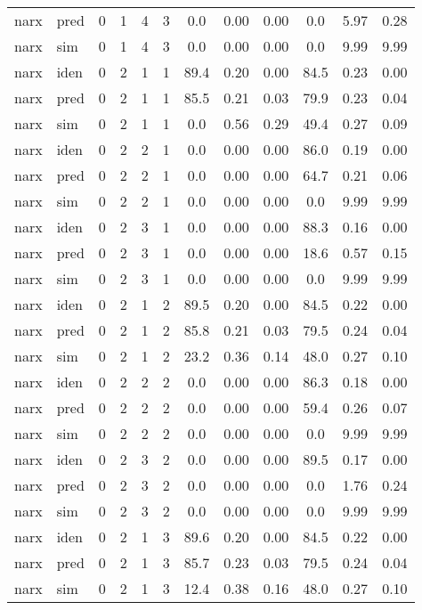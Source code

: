 \begin{landscape}
\begin{center}
\begin{longtable}{ll|cccc|ccc|ccc}
narx & pred & 0 & 1 & 4 & 3 & 0.0 & 0.00 & 0.00 & 0.0 & 5.97 & 0.28 \\ 
narx & sim & 0 & 1 & 4 & 3 & 0.0 & 0.00 & 0.00 & 0.0 & 9.99 & 9.99 \\ 
 \hline 
narx & iden & 0 & 2 & 1 & 1 & 89.4 & 0.20 & 0.00 & 84.5 & 0.23 & 0.00 \\ 
narx & pred & 0 & 2 & 1 & 1 & 85.5 & 0.21 & 0.03 & 79.9 & 0.23 & 0.04 \\ 
narx & sim & 0 & 2 & 1 & 1 & 0.0 & 0.56 & 0.29 & 49.4 & 0.27 & 0.09 \\ 
 \hline 
narx & iden & 0 & 2 & 2 & 1 & 0.0 & 0.00 & 0.00 & 86.0 & 0.19 & 0.00 \\ 
narx & pred & 0 & 2 & 2 & 1 & 0.0 & 0.00 & 0.00 & 64.7 & 0.21 & 0.06 \\ 
narx & sim & 0 & 2 & 2 & 1 & 0.0 & 0.00 & 0.00 & 0.0 & 9.99 & 9.99 \\ 
 \hline 
narx & iden & 0 & 2 & 3 & 1 & 0.0 & 0.00 & 0.00 & 88.3 & 0.16 & 0.00 \\ 
narx & pred & 0 & 2 & 3 & 1 & 0.0 & 0.00 & 0.00 & 18.6 & 0.57 & 0.15 \\ 
narx & sim & 0 & 2 & 3 & 1 & 0.0 & 0.00 & 0.00 & 0.0 & 9.99 & 9.99 \\ 
 \hline 
narx & iden & 0 & 2 & 1 & 2 & 89.5 & 0.20 & 0.00 & 84.5 & 0.22 & 0.00 \\ 
narx & pred & 0 & 2 & 1 & 2 & 85.8 & 0.21 & 0.03 & 79.5 & 0.24 & 0.04 \\ 
narx & sim & 0 & 2 & 1 & 2 & 23.2 & 0.36 & 0.14 & 48.0 & 0.27 & 0.10 \\ 
 \hline 
narx & iden & 0 & 2 & 2 & 2 & 0.0 & 0.00 & 0.00 & 86.3 & 0.18 & 0.00 \\ 
narx & pred & 0 & 2 & 2 & 2 & 0.0 & 0.00 & 0.00 & 59.4 & 0.26 & 0.07 \\ 
narx & sim & 0 & 2 & 2 & 2 & 0.0 & 0.00 & 0.00 & 0.0 & 9.99 & 9.99 \\ 
 \hline 
narx & iden & 0 & 2 & 3 & 2 & 0.0 & 0.00 & 0.00 & 89.5 & 0.17 & 0.00 \\ 
narx & pred & 0 & 2 & 3 & 2 & 0.0 & 0.00 & 0.00 & 0.0 & 1.76 & 0.24 \\ 
narx & sim & 0 & 2 & 3 & 2 & 0.0 & 0.00 & 0.00 & 0.0 & 9.99 & 9.99 \\ 
 \hline 
narx & iden & 0 & 2 & 1 & 3 & 89.6 & 0.20 & 0.00 & 84.5 & 0.22 & 0.00 \\ 
narx & pred & 0 & 2 & 1 & 3 & 85.7 & 0.23 & 0.03 & 79.5 & 0.24 & 0.04 \\ 
narx & sim & 0 & 2 & 1 & 3 & 12.4 & 0.38 & 0.16 & 48.0 & 0.27 & 0.10 \\ 

\end{longtable}
\end{center}
\end{landscape}
